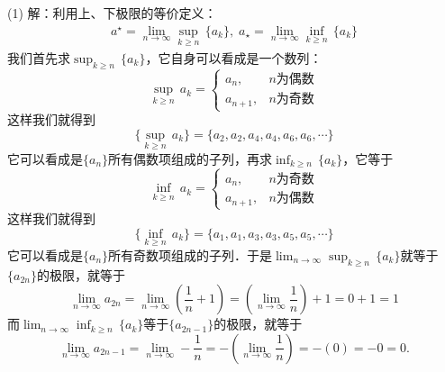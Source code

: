 \noindent (1) 解：利用上、下极限的等价定义：
\begin{align}
    a^\star = \lim_{n \to \infty} \sup_{k \geq n} \, \{ a_k \}, \; a_\star = \lim_{n \to \infty} \inf_{k \geq n} \, \{a_k\}
\end{align}
我们首先求$\displaystyle\sup_{k \geq n} \, \{a_k\}$，它自身可以看成是一个数列：
\begin{equation}
    \sup_{k \geq n} \, a_k = \begin{cases}
        a_n, & n\text{为偶数} \\
        a_{n+1}, & n\text{为奇数} 
    \end{cases}
\end{equation}
这样我们就得到
\begin{equation}
    \{ \sup_{k \geq n} \, a_k \} = \{ a_2, a_2, a_4, a_4, a_6, a_6, \cdots \}
\end{equation}
它可以看成是$\{ a_n \}$所有偶数项组成的子列，再求$\displaystyle \inf_{k \geq n} \, \{ a_k \}$，它等于
\begin{equation}
    \inf_{k \geq n} \, a_k = \begin{cases}
        a_n, & n\text{为奇数} \\
        a_{n+1}, & n\text{为偶数} 
    \end{cases}
\end{equation}
这样我们就得到
\begin{equation}
    \{ \inf_{k \geq n} \, a_k \} = \{ a_1, a_1, a_3, a_3, a_5, a_5, \cdots \}
\end{equation}
它可以看成是$\{ a_n \}$所有奇数项组成的子列．于是$\displaystyle \lim_{n \to \infty} \sup_{k \geq n} \, \{ a_k \}$就等于$\{ a_{2n} \}$的极限，就等于
\begin{equation}
    \lim_{n \to \infty} a_{2n} = \lim_{n \to \infty} \left( \frac{1}{n} + 1 \right) = \left(\lim_{n\to\infty} \frac{1}{n}\right) + 1= 0 + 1 = 1
\end{equation}
而$\displaystyle \lim_{n \to \infty} \inf_{k \geq n} \, \{ a_k \}$等于$\{ a_{2n-1} \}$的极限，就等于
\begin{equation}
    \lim_{n \to \infty} a_{2n - 1} = \lim_{n \to \infty} -\frac{1}{n} = - \left(\lim_{n\to\infty} \frac{1}{n}\right) = -\left( 0 \right) = -0 = 0.
\end{equation}

